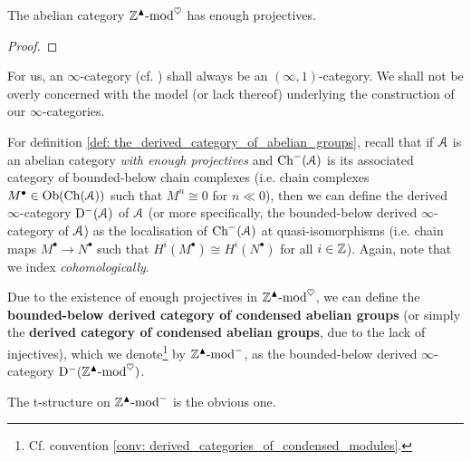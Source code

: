            \begin{theorem} \label{theorem: the_large_category_of_condensed_abelian_groups_has_enough_projectives}
                The abelian category $\mathbb{Z}^{\blacktriangle}\text{-}\mathrm{mod}^{\heartsuit}$ has enough projectives.
            \end{theorem}
                \begin{proof}
                    
                \end{proof}
            \begin{convention}
                For us, an $\infty$-category (cf. \cite[Chapters 1-3]{HTT}) shall always be an $(\infty, 1)$-category. We shall not be overly concerned with the model (or lack thereof) underlying the construction of our $\infty$-categories. 
            \end{convention}
            \begin{remark}
                For definition \ref{def: the_derived_category_of_abelian_groups}, recall that if $\mathcal{A}$ is an abelian category \textit{with enough projectives} and $\mathrm{Ch}^-(\mathcal{A})$ is its associated category of bounded-below chain complexes (i.e. chain complexes $M^{\bullet} \in \mathrm{Ob}(\mathrm{Ch}(\mathcal{A}))$ such that $M^n \cong 0$ for $n \ll 0$), then we can define the derived $\infty$-category $\mathrm{D}^-(\mathcal{A})$ of $\mathcal{A}$ (or more specifically, the bounded-below derived $\infty$-category of $\mathcal{A}$) as the localisation of $\mathrm{Ch}^-(\mathcal{A})$ at quasi-isomorphisms (i.e. chain maps $M^{\bullet} \to N^{\bullet}$ such that $H^i(M^{\bullet}) \cong H^i(N^{\bullet})$ for all $i \in \mathbb{Z}$). Again, note that we index \textit{cohomologically}. 
            \end{remark}
            \begin{definition} \label{def: the_derived_category_of_condensed_abelian_groups}
                Due to the existence of enough projectives in $\mathbb{Z}^{\blacktriangle}\text{-}\mathrm{mod}^{\heartsuit}$, we can define the \textbf{bounded-below derived category of condensed abelian groups} (or simply the \textbf{derived category of condensed abelian groups}, due to the lack of injectives), which we denote\footnote{Cf. convention \ref{conv: derived_categories_of_condensed_modules}.} by $\mathbb{Z}^{\blacktriangle}\text{-}\mathrm{mod}^-$, as the bounded-below derived $\infty$-category $\mathrm{D}^-(\mathbb{Z}^{\blacktriangle}\text{-}\mathrm{mod}^{\heartsuit})$.
                
                The t-structure on $\mathbb{Z}^{\blacktriangle}\text{-}\mathrm{mod}^-$ is the obvious one.
            \end{definition}
